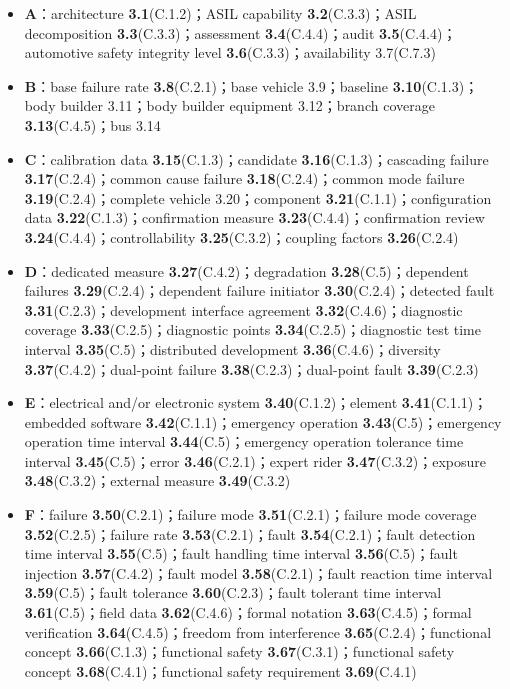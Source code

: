 \begin{itemize}
\item \textbf{A}：architecture \textbf{3.1}(C.1.2)；ASIL capability \textbf{3.2}(C.3.3)；ASIL decomposition \textbf{3.3}(C.3.3)；assessment \textbf{3.4}(C.4.4)；audit \textbf{3.5}(C.4.4)；automotive safety integrity level \textbf{3.6}(C.3.3)；availability 3.7(C.7.3)
\item \textbf{B}：base failure rate \textbf{3.8}(C.2.1)；base vehicle 3.9；baseline \textbf{3.10}(C.1.3)；body builder 3.11；body builder equipment 3.12；branch coverage \textbf{3.13}(C.4.5)；bus 3.14
\item \textbf{C}：calibration data \textbf{3.15}(C.1.3)；candidate \textbf{3.16}(C.1.3)；cascading failure \textbf{3.17}(C.2.4)；common cause failure \textbf{3.18}(C.2.4)；common mode failure \textbf{3.19}(C.2.4)；complete vehicle 3.20；component \textbf{3.21}(C.1.1)；configuration data \textbf{3.22}(C.1.3)；confirmation measure \textbf{3.23}(C.4.4)；confirmation review \textbf{3.24}(C.4.4)；controllability \textbf{3.25}(C.3.2)；coupling factors \textbf{3.26}(C.2.4)
\item \textbf{D}：dedicated measure \textbf{3.27}(C.4.2)；degradation \textbf{3.28}(C.5)；dependent failures \textbf{3.29}(C.2.4)；dependent failure initiator \textbf{3.30}(C.2.4)；detected fault \textbf{3.31}(C.2.3)；development interface agreement \textbf{3.32}(C.4.6)；diagnostic coverage \textbf{3.33}(C.2.5)；diagnostic points \textbf{3.34}(C.2.5)；diagnostic test time interval \textbf{3.35}(C.5)；distributed development \textbf{3.36}(C.4.6)；diversity \textbf{3.37}(C.4.2)；dual-point failure \textbf{3.38}(C.2.3)；dual-point fault \textbf{3.39}(C.2.3)
\item \textbf{E}：electrical and/or electronic system \textbf{3.40}(C.1.2)；element \textbf{3.41}(C.1.1)；embedded software \textbf{3.42}(C.1.1)；emergency operation \textbf{3.43}(C.5)；emergency operation time interval \textbf{3.44}(C.5)；emergency operation tolerance time interval \textbf{3.45}(C.5)；error \textbf{3.46}(C.2.1)；expert rider \textbf{3.47}(C.3.2)；exposure \textbf{3.48}(C.3.2)；external measure \textbf{3.49}(C.3.2)
\item \textbf{F}：failure \textbf{3.50}(C.2.1)；failure mode \textbf{3.51}(C.2.1)；failure mode coverage \textbf{3.52}(C.2.5)；failure rate \textbf{3.53}(C.2.1)；fault \textbf{3.54}(C.2.1)；fault detection time interval \textbf{3.55}(C.5)；fault handling time interval \textbf{3.56}(C.5)；fault injection \textbf{3.57}(C.4.2)；fault model \textbf{3.58}(C.2.1)；fault reaction time interval \textbf{3.59}(C.5)；fault tolerance \textbf{3.60}(C.2.3)；fault tolerant time interval \textbf{3.61}(C.5)；field data \textbf{3.62}(C.4.6)；formal notation \textbf{3.63}(C.4.5)；formal verification \textbf{3.64}(C.4.5)；freedom from interference \textbf{3.65}(C.2.4)；functional concept \textbf{3.66}(C.1.3)；functional safety \textbf{3.67}(C.3.1)；functional safety concept \textbf{3.68}(C.4.1)；functional safety requirement \textbf{3.69}(C.4.1)

\end{itemize}
